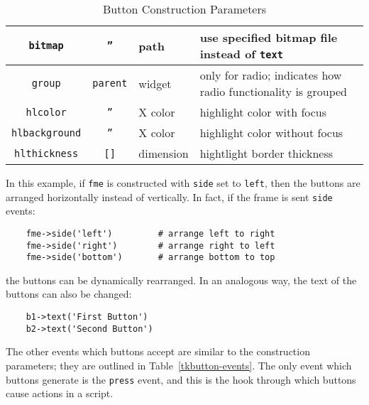 \begin{table}[tbh]
{\begin{center}
\begin{tabular}{|c|c|p{1.6in}|p{1.9in}|}
{\tt bitmap}            & {\tt ''}      & path & use specified bitmap file instead of {\tt text} \\ \hline
{\tt group}             & {\tt parent}  & widget & only for radio; indicates how radio functionality is grouped \\ \hline
{\tt hlcolor}		& {\tt ''}	& X color & highlight color with focus \\ \hline
{\tt hlbackground}	& {\tt ''}	& X color & highlight color without focus \\ \hline
{\tt hlthickness}	& {\tt []}	& dimension & hightlight border thickness \\ \hline
\end{tabular}
\end{center}
}
\caption{ Button Construction Parameters }
\label{tkbutton-params}
\end{table}

In this example, if {\tt fme} is constructed with
{\tt side} set to {\tt left}, then the buttons are arranged
horizontally instead of vertically. In fact, if the frame is sent {\tt side}
events:
\begin{verbatim}
    fme->side('left')         # arrange left to right
    fme->side('right')        # arrange right to left
    fme->side('bottom')       # arrange bottom to top
\end{verbatim}
the buttons can be dynamically rearranged. In an analogous way, the text of
the buttons can also be changed:
\begin{verbatim}
    b1->text('First Button')
    b2->text('Second Button')
\end{verbatim}
The other events which buttons accept are similar to the construction parameters;
they are outlined in Table~\ref{tkbutton-events}. The only event which buttons
generate is the {\tt press} event, and this is the hook through which buttons
cause actions in a script.

